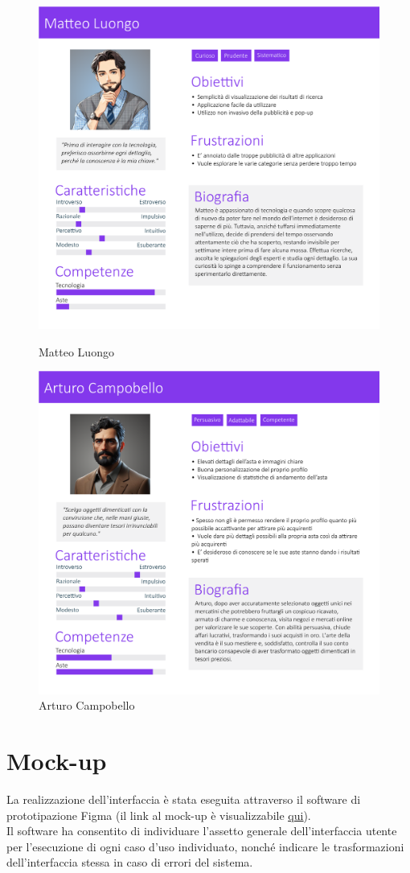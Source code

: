         \begin{figure}[!htb]
           \begin{minipage}{0.48\textwidth}
                \centering
             \includegraphics[width=.7\linewidth]{Immagini/Personas/Matteo Luongo.pdf}
             \caption{Matteo Luongo}\label{Fig:Matteo Luongo}
           \end{minipage}\hfill
           \begin{minipage}{0.48\textwidth}
                \centering
             \includegraphics[width=.7\linewidth]{Immagini/Personas/Arturo Campobello.pdf}
             \caption{Arturo Campobello}\label{Fig:Arturo Campobello}
           \end{minipage}
        \end{figure}

    \newpage

    \section{Mock-up}
    La realizzazione dell'interfaccia è stata eseguita attraverso il software di prototipazione Figma (il link al mock-up è visualizzabile \href{https://www.figma.com/file/kieERzm8U3jsHALXk4IjKS/Mockup?type=design&node-id=0%3A1&mode=design&t=CAyNdczd5giYLJ1j-1}{\underline{qui}}). \\
    Il software ha consentito di individuare l'assetto generale dell'interfaccia utente per l'esecuzione di ogni caso d'uso individuato, nonché indicare le trasformazioni dell'interfaccia stessa in caso di errori del sistema.


